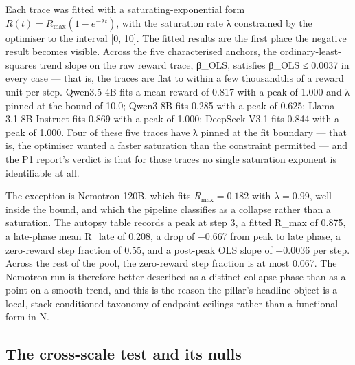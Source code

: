 \documentclass[12pt,a4paper]{report}
\begin{document}
Each trace was fitted with a saturating-exponential form
\(R(t) = R_{\max}(1 - e^{-\lambda t})\), with the saturation rate λ
constrained by the optimiser to the interval {[}0, 10{]}. The fitted
results are the first place the negative result becomes visible. Across
the five characterised anchors, the ordinary-least-squares trend slope
on the raw reward trace, β\_OLS, satisfies \textbar β\_OLS\textbar{} ≤
0.0037 in every case --- that is, the traces are flat to within a few
thousandths of a reward unit per step. Qwen3.5-4B fits a mean reward of
0.817 with a peak of 1.000 and λ pinned at the bound of 10.0; Qwen3-8B
fits 0.285 with a peak of 0.625; Llama-3.1-8B-Instruct fits 0.869 with a
peak of 1.000; DeepSeek-V3.1 fits 0.844 with a peak of 1.000. Four of
these five traces have λ pinned at the fit boundary --- that is, the
optimiser wanted a faster saturation than the constraint permitted ---
and the P1 report's verdict is that for those traces no single
saturation exponent is identifiable at all.

The exception is Nemotron-120B, which fits \(R_{\max} = 0.182\) with
\(\lambda = 0.99\), well inside the bound, and which the pipeline
classifies as a collapse rather than a saturation. The autopsy table
records a peak at step 3, a fitted R̂\_max of 0.875, a late-phase mean
R̄\_late of 0.208, a drop of −0.667 from peak to late phase, a
zero-reward step fraction of 0.55, and a post-peak OLS slope of −0.0036
per step. Across the rest of the pool, the zero-reward step fraction is
at most 0.067. The Nemotron run is therefore better described as a
distinct collapse phase than as a point on a smooth trend, and this is
the reason the pillar's headline object is a local, stack-conditioned
taxonomy of endpoint ceilings rather than a functional form in N.

\subsection{The cross-scale test and its
nulls}\label{the-cross-scale-test-and-its-nulls}
\end{document}
